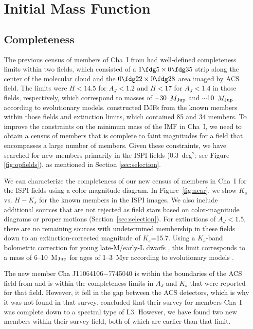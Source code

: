 \documentclass{emulateapj}
\begin{document}
\section{Initial Mass Function}

\subsection{Completeness}
\label{sec:comp}

The previous census of members of Cha~I from \cite{luhm07}
had well-defined completeness limits within two fields,
which consisted of a $1\fdg5 \times 0\fdg35$ strip along the center of 
the molecular cloud and the $0\fdg22 \times 0\fdg28$ area imaged by ACS field. 
The limits were $H < 14.5$ for $A_J<1.2$ and $H < 17$ for $A_J<1.4$ 
in those fields, respectively, 
which correspond to masses of $\sim$30~$M_{\rm Jup}$ and $\sim$10~$M_{\rm Jup}$
according to evolutionary models. 
\cite{luhm07} constructed IMFs from the known members within those fields and 
extinction limits, which contained 85 and 34 members. 
To improve the constraints on the minimum mass of the IMF in Cha~I,
we need to obtain a census of members that is complete to faint magnitudes for a field 
that encompasses a large number of members. 
Given these constraints,
we have searched for new members primarily in the ISPI fields 
(0.3~deg$^2$; see Figure \ref{fig:opfields}),
as mentioned in Section \ref{sec:selection}.

We can characterize the completeness of our new census of members in Cha~I for the 
ISPI fields using a color-magnitude diagram.
In Figure~\ref{fig:near},
we show $K_s$ vs. $H-K_s$ for the 
known members in the ISPI images.
We also include additional sources that are not rejected as field stars 
based on color-magnitude diagrams or proper motions (Section~\ref{sec:selection}).
For extinctions of $A_J < 1.5$, 
there are no remaining sources with undetermined membership in 
these fields down to an extinction-corrected magnitude of $K_s$=15.7.
Using a $K_s$-band bolometric correction for young late-M/early-L dwarfs \citep{fil15},
this limit corresponds to a mass of 6--10~M$_{\rm Jup}$ for ages of 1--3~Myr
according to evolutionary models \citep{bur97,cha00,bar15}.

The new member Cha J11064106$-$7745040 is within the boundaries of the ACS field from \cite{luhm07}
and is within the completeness limits in $A_J$ and $K_s$ that were reported for that field. However, 
it fell in the gap between the ACS detectors, which is why it was not found in that survey. 
\citet{muz15} concluded that their survey for members Cha~I was complete down to a spectral
type of L3. However, we have found two new members within their survey field, 
both of which are earlier than that limit.
\end{document}
